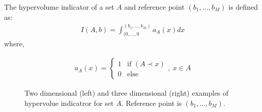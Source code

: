 The hypervolume indicator of a set $A$  and reference point $(b_1,...,b_M)$ is defined as:
\begin{eqnarray}
	I(A,b)=\int _{(0,...,0}^{(b_1,...,b_M)}a_A(x)dx 
\label{hyperVeq}
\end{eqnarray}  
where,

\begin{eqnarray}
	\nonumber
	a_A(x) = \left\{ \begin{array}{ll}
    1 & \mbox{if $(A\prec{x})$}\\
    0 & \mbox{else}\end{array} \right.
    ,~x\in A
\end{eqnarray}    


\begin{figure}[h!]
\begin{minipage}[b]{0.5\linewidth}
 \centering
\end{minipage}
\begin{minipage}[b]{0.5\linewidth}
 \centering
\end{minipage}
\caption{Two dimensional (left) and three dimensional (right) examples of hypervolue indicatror for set $A$. Reference point is $(b_1,...,b_M)$.}
\label{hyperV}
\end{figure}

